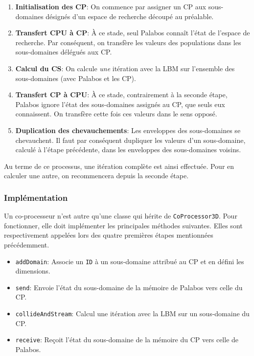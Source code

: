 \begin{enumerate}
\item \textbf{Initialisation des \ac{CP}}: On commence par assigner un \ac{CP} aux sous-domaines désignés d'un espace de recherche découpé au préalable.
\item \textbf{Transfert \ac{CPU} à \ac{CP}}: À ce stade, seul Palabos connaît l'état de l'espace de recherche. Par conséquent, on transfère les valeurs des populations dans les sous-domaines délégués aux \ac{CP}.
\item \textbf{Calcul du \ac{CS}}: On calcule \textit{une} itération avec la \ac{LBM} sur l'ensemble des sous-domaines (avec Palabos et les \ac{CP}).
\item \textbf{Transfert \ac{CP} à \ac{CPU}}: À ce stade, contrairement à la seconde étape, Palabos ignore l'état des sous-domaines assignés au \ac{CP}, que seuls eux connaissent. On transfère cette fois ces valeurs dans le sens opposé.
\item \textbf{Duplication des chevauchements}:  Les enveloppes des sous-domaines se chevauchent. Il faut par conséquent dupliquer les valeurs d'un sous-domaine, calculé à l'étape précédente, dans les enveloppes des sous-domaines voisins.
\end{enumerate}

Au terme de ce processus, une itération complète est ainsi effectuée. Pour en calculer une autre, on recommencera depuis la seconde étape. 

\subsubsection{Implémentation}
Un co-processeur n'est autre qu'une classe qui hérite de \texttt{CoProcessor3D}. Pour fonctionner, elle doit implémenter les principales méthodes suivantes. Elles sont respectivement appelées lors des quatre premières étapes mentionnées précédemment.

\begin{itemize}
\item \texttt{addDomain}: Associe un \texttt{ID} à un sous-domaine attribué au \ac{CP} et en défini les dimensions.
\item \texttt{send}: Envoie l'état du sous-domaine de la mémoire de Palabos vers celle du \ac{CP}.
\item \texttt{collideAndStream}: Calcul une itération avec la \ac{LBM} sur un sous-domaine du \ac{CP}.
\item \texttt{receive}: Reçoit l'état du sous-domaine de la mémoire du \ac{CP} vers celle de Palabos.
\end{itemize}

